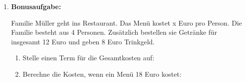 \begin{enumerate}[label=\arabic*., resume]
    \item \textbf{Bonusaufgabe:}

    Familie Müller geht ins Restaurant. Das Menü kostet x Euro pro Person. Die Familie besteht aus 4 Personen. Zusätzlich bestellen sie Getränke für insgesamt 12 Euro und geben 8 Euro Trinkgeld.

    \vspace{0.5cm}

    \begin{enumerate}[label=\alph*)]
        \item Stelle einen Term für die Gesamtkosten auf: \underline{\hspace{4cm}}
        \vspace{0.5cm}
        \item Berechne die Kosten, wenn ein Menü 18 Euro kostet: \underline{\hspace{4cm}}
    \end{enumerate}

\end{enumerate}